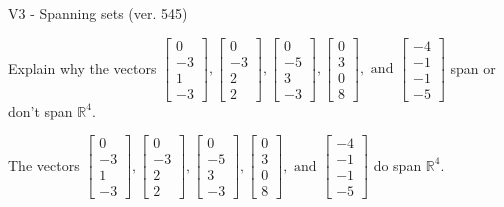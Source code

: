 \begin{exercise}
  \begin{exerciseTitle}V3 - Spanning sets (ver. 545)\end{exerciseTitle}
  \begin{exerciseStatement}
    Explain why the vectors \(\left[\begin{array}{r}
0 \\
-3 \\
1 \\
-3
\end{array}\right] , \left[\begin{array}{r}
0 \\
-3 \\
2 \\
2
\end{array}\right] , \left[\begin{array}{r}
0 \\
-5 \\
3 \\
-3
\end{array}\right] , \left[\begin{array}{r}
0 \\
3 \\
0 \\
8
\end{array}\right] , \text{ and } \left[\begin{array}{r}
-4 \\
-1 \\
-1 \\
-5
\end{array}\right]\) span or don't span \(\mathbb{R}^4\). 
	


  \end{exerciseStatement}
  \begin{exerciseAnswer}
   The vectors \(\left[\begin{array}{r}
0 \\
-3 \\
1 \\
-3
\end{array}\right] , \left[\begin{array}{r}
0 \\
-3 \\
2 \\
2
\end{array}\right] , \left[\begin{array}{r}
0 \\
-5 \\
3 \\
-3
\end{array}\right] , \left[\begin{array}{r}
0 \\
3 \\
0 \\
8
\end{array}\right] , \text{ and } \left[\begin{array}{r}
-4 \\
-1 \\
-1 \\
-5
\end{array}\right]\) 
  	 do  
	span \(\mathbb{R}^4\).
  



\end{exerciseAnswer}
\end{exercise}
